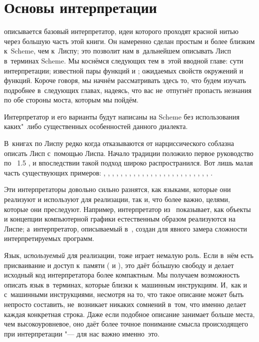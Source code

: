 \chapter{Основы интерпретации}\label{chapter:basics}

 описывается базовый интерпретатор, идеи
которого проходят красной нитью через большую часть этой книги. Он намеренно
сделан простым и более близким к~Scheme, чем к~Лиспу; это позволит нам
в~дальнейшем описывать Лисп в~терминах Scheme. Мы коснёмся следующих тем в~этой
вводной главе: сути интерпретации; известной пары функций  и
; ожидаемых свойств окружений и функций. Короче говоря, мы начнём
рассматривать здесь то, что будем изучать подробнее в~следующих главах, надеясь,
что вас не~отпугнёт пропасть незнания по обе стороны моста, которым мы пойдём.

\bigskip

Интерпретатор и его варианты будут написаны на Scheme без использования
каких"~либо существенных особенностей данного диалекта.

\begingroup
{}
В~книгах по Лиспу редко когда отказываются от нарциссического соблазна описать
Лисп с~помощью Лиспа. Начало традиции положило первое руководство по
\LISP~1.5 \cite{mae+62}, и впоследствии такой подход широко распространился.
Вот лишь малая часть существующих примеров: \cite{rib69}, \cite{gre77},
\cite{que82}, \cite{cay83}, \cite{cha80}, \cite{sj93}, \cite{rey72},
\cite{gor75}, \cite{ss75}, \cite{all78}, \cite{mcc78b}, \cite{lak80},
\cite{hen80}, \cite{bm82}, \cite{cli84}, \cite{fw84}, \cite{drs84},
\cite{as85}, \cite{r3r86}, \cite{mas86}, \cite{dyb87}, \cite{wh89},
\cite{kes88}, \cite{lf88}, \cite{dil88}, \cite{kam90}.\par\endgroup

Эти интерпретаторы довольно сильно разнятся, как языками, которые они реализуют
и используют для реализации, так и, что более важно, целями, которые они
преследуют. Например, интерпретатор из~\cite{lak80} показывает, как объекты
и концепции компьютерной графики естественным образом реализуются на Лиспе;
а~интерпретатор, описываемый в~\cite{bm82}, создан для явного замера сложности
интерпретируемых программ.

Язык, \emph{используемый} для реализации, тоже играет немалую роль. Если в~нём
есть присваивание и доступ к~памяти ( и ), это даёт
б\'{о}льшую свободу и делает исходный код интерпретатора более компактным. Мы
получаем возможность описать язык в~терминах, которые близки к~машинным
инструкциям. И,~как и с~машинными инструкциями, несмотря на то, что такое
описание может быть непросто составить, не~возникает никаких сомнений в~том, что
именно делает каждая конкретная строка. Даже если подобное описание занимает
больше места, чем высокоуровневое, оно даёт более точное понимание смысла
происходящего при интерпретации "--- для нас важно именно~это.

